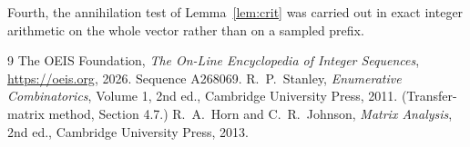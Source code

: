 \documentclass[11pt,a4paper]{article}
\theoremstyle{plain}
\theoremstyle{definition}
\begin{document}
Fourth, the annihilation test of Lemma~\ref{lem:crit} was carried out in exact integer
arithmetic on the whole vector rather than on a sampled prefix.

\begin{thebibliography}{9}
 The OEIS Foundation, \emph{The On-Line Encyclopedia of Integer
Sequences}, \url{https://oeis.org}, 2026. Sequence A268069.
 R.~P.~Stanley, \emph{Enumerative Combinatorics}, Volume 1, 2nd ed.,
Cambridge University Press, 2011. (Transfer-matrix method, Section 4.7.)
 R.~A.~Horn and C.~R.~Johnson, \emph{Matrix Analysis}, 2nd ed., Cambridge
University Press, 2013.
\end{thebibliography}
\end{document}
